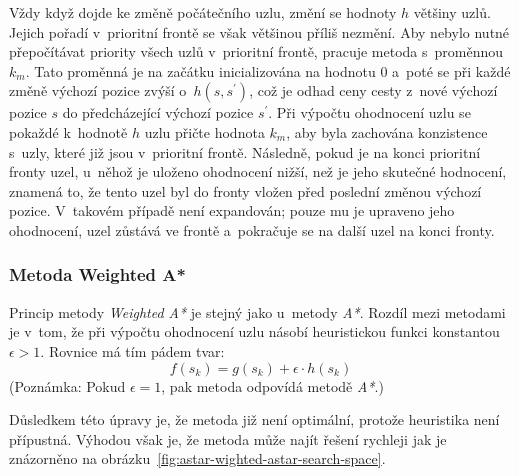 Vždy když dojde ke změně počátečního uzlu, změní se hodnoty $h$ většiny uzlů. Jejich pořadí v~prioritní frontě se však většinou příliš nezmění. Aby nebylo nutné přepočítávat priority všech uzlů v~prioritní frontě, pracuje metoda s~proměnnou $k_m$. Tato proměnná je na začátku inicializována na hodnotu $0$ a~poté se při každé změně výchozí pozice zvýší o~$h(s, s^\prime)$, což je odhad ceny cesty z~nové výchozí pozice $s$ do předcházející výchozí pozice $s^\prime$. Při výpočtu ohodnocení uzlu se pokaždé k~hodnotě $h$ uzlu přičte hodnota $k_m$, aby byla zachována konzistence s~uzly, které již jsou v~prioritní frontě. Následně, pokud je na konci prioritní fronty uzel, u~něhož je uloženo ohodnocení nižší, než je jeho skutečné hodnocení, znamená to, že tento uzel byl do fronty vložen před poslední změnou výchozí pozice. V~takovém případě není expandován; pouze mu je upraveno jeho ohodnocení, uzel zůstává ve frontě a~pokračuje se na další uzel na konci fronty.

\subsubsection*{Metoda Weighted A*}

Princip metody \emph{Weighted A*} \cite{ARA_star} je stejný jako u~metody \emph{A*}. Rozdíl mezi metodami je v~tom, že při výpočtu ohodnocení uzlu násobí heuristickou funkci konstantou $\epsilon > 1$. Rovnice má tím pádem tvar:
\begin{equation}
    f(s_k) = g(s_k) + \epsilon \cdot h(s_k)
\end{equation}
(Poznámka: Pokud $\epsilon = 1$, pak metoda odpovídá metodě \emph{A*}.)

Důsledkem této úpravy je, že metoda již není optimální, protože heuristika není přípustná. Výhodou však je, že metoda může najít řešení rychleji jak je znázorněno na obrázku~\ref{fig:astar-wighted-astar-search-space}.

